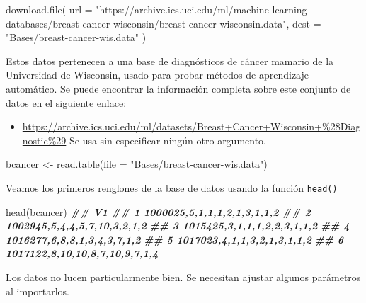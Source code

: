 \documentclass[
]{book}
\newenvironment{Shaded}{\begin{snugshade}}{\end{snugshade}}
\newcommand{\AttributeTok}[1]{\textcolor[rgb]{0.77,0.63,0.00}{#1}}
\newcommand{\DocumentationTok}[1]{\textcolor[rgb]{0.56,0.35,0.01}{\textbf{\textit{#1}}}}
\newcommand{\FunctionTok}[1]{\textcolor[rgb]{0.00,0.00,0.00}{#1}}
\newcommand{\NormalTok}[1]{#1}
\newcommand{\OtherTok}[1]{\textcolor[rgb]{0.56,0.35,0.01}{#1}}
\newcommand{\StringTok}[1]{\textcolor[rgb]{0.31,0.60,0.02}{#1}}
\providecommand{\tightlist}{%
  \setlength{\itemsep}{0pt}\setlength{\parskip}{0pt}}
\begin{document}
\begin{Shaded}
\begin{Highlighting}[]
\FunctionTok{download.file}\NormalTok{(}
  \AttributeTok{url =} \StringTok{"https://archive.ics.uci.edu/ml/machine{-}learning{-}databases/breast{-}cancer{-}wisconsin/breast{-}cancer{-}wisconsin.data"}\NormalTok{, }
  \AttributeTok{dest =} \StringTok{"Bases/breast{-}cancer{-}wis.data"}
\NormalTok{)}
\end{Highlighting}
\end{Shaded}

Estos datos pertenecen a una base de diagnósticos de cáncer mamario de la Universidad de Wisconsin, usado para probar métodos de aprendizaje automático. Se puede encontrar la información completa sobre este conjunto de datos en el siguiente enlace:

\begin{itemize}
\tightlist
\item
  \url{https://archive.ics.uci.edu/ml/datasets/Breast+Cancer+Wisconsin+\%28Diagnostic\%29}
  Se usa sin especificar ningún otro argumento.
\end{itemize}

\begin{Shaded}
\begin{Highlighting}[]
\NormalTok{bcancer }\OtherTok{\textless{}{-}} \FunctionTok{read.table}\NormalTok{(}\AttributeTok{file =} \StringTok{"Bases/breast{-}cancer{-}wis.data"}\NormalTok{)}
\end{Highlighting}
\end{Shaded}

Veamos los primeros renglones de la base de datos usando la función \texttt{head()}

\begin{Shaded}
\begin{Highlighting}[]
\FunctionTok{head}\NormalTok{(bcancer)}
\DocumentationTok{\#\#                               V1}
\DocumentationTok{\#\# 1    1000025,5,1,1,1,2,1,3,1,1,2}
\DocumentationTok{\#\# 2   1002945,5,4,4,5,7,10,3,2,1,2}
\DocumentationTok{\#\# 3    1015425,3,1,1,1,2,2,3,1,1,2}
\DocumentationTok{\#\# 4    1016277,6,8,8,1,3,4,3,7,1,2}
\DocumentationTok{\#\# 5    1017023,4,1,1,3,2,1,3,1,1,2}
\DocumentationTok{\#\# 6 1017122,8,10,10,8,7,10,9,7,1,4}
\end{Highlighting}
\end{Shaded}

Los datos no lucen particularmente bien. Se necesitan ajustar algunos parámetros al importarlos.
\end{document}
